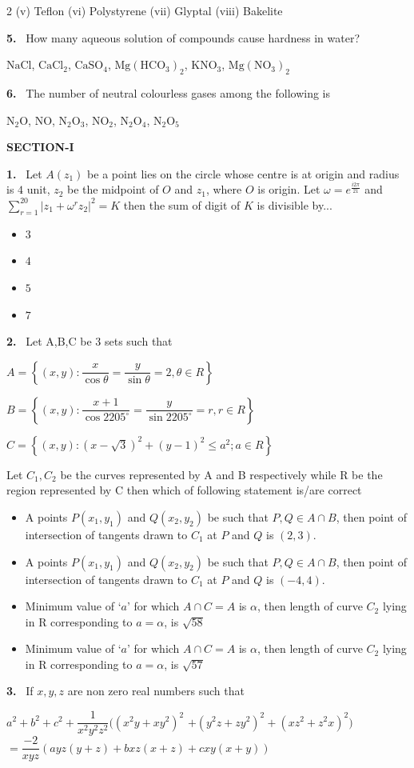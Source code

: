 \documentclass[10pt]{extarticle}
\newcommand{\partsec}[2]{\par\medskip\noindent{\large\bfseries PART-#1: #2}\par\smallskip}
\newcommand{\sect}[1]{\par\smallskip\noindent\textbf{#1}\par}
\newcommand{\qn}[1]{\par\smallskip\noindent\textbf{#1.}~}
\newenvironment{qoptions}{\begin{itemize}[leftmargin=1.8em,itemsep=1pt,topsep=2pt,label={}]}{\end{itemize}}
\newcommand{\opt}[2]{\item[(#1)] #2}
\begin{document}
\begin{multicols}{2}
(v) Teflon \quad (vi) Polystyrene \quad (vii) Glyptal \quad (viii) Bakelite
\qn{5} How many aqueous solution of compounds cause hardness in water?

$\mathrm{NaCl}$, $\mathrm{CaCl_2}$, $\mathrm{CaSO_4}$, $\mathrm{Mg(HCO_3)_2}$, $\mathrm{KNO_3}$, $\mathrm{Mg(NO_3)_2}$
\qn{6} The number of neutral colourless gases among the following is \underline{\hspace{0.8cm}}

$\mathrm{N_2O}$, NO, $\mathrm{N_2O_3}$, $\mathrm{NO_2}$, $\mathrm{N_2O_4}$, $\mathrm{N_2O_5}$
\partsec{3}{MATHEMATICS}
\sect{SECTION-I}
\qn{1} Let $A(z_1)$ be a point lies on the circle whose centre is at origin and radius is $4$ unit, $z_2$ be the midpoint of $O$ and $z_1$, where $O$ is origin. Let $\omega=e^{\frac{i2\pi}{21}}$ and $\displaystyle\sum_{r=1}^{20}|z_1+\omega^rz_2|^2=K$ then the sum of digit of $K$ is divisible by...
\begin{qoptions}
\opt{A}{$3$}
\opt{B}{$4$}
\opt{C}{$5$}
\opt{D}{$7$}
\end{qoptions}
\qn{2} Let A,B,C be $3$ sets such that

$A=\left\{(x,y):\dfrac{x}{\cos\theta}=\dfrac{y}{\sin\theta}=2,\theta\in R\right\}$

$B=\left\{(x,y):\dfrac{x+1}{\cos2205^\circ}=\dfrac{y}{\sin2205^\circ}=r,r\in R\right\}$

$C=\left\{(x,y):(x-\sqrt3)^2+(y-1)^2\leqslant a^2;a\in R\right\}$

Let $C_1,C_2$ be the curves represented by A and B respectively while R be the region represented by C then which of following statement is/are correct
\begin{qoptions}
\opt{A}{A points $P(x_1,y_1)$ and $Q(x_2,y_2)$ be such that $P,Q\in A\cap B$, then point of intersection of tangents drawn to $C_1$ at $P$ and $Q$ is $(2,3)$.}
\opt{B}{A points $P(x_1,y_1)$ and $Q(x_2,y_2)$ be such that $P,Q\in A\cap B$, then point of intersection of tangents drawn to $C_1$ at $P$ and $Q$ is $(-4,4)$.}
\opt{C}{Minimum value of `$a$' for which $A\cap C=A$ is $\alpha$, then length of curve $C_2$ lying in R corresponding to $a=\alpha$, is $\sqrt{58}$}
\opt{D}{Minimum value of `$a$' for which $A\cap C=A$ is $\alpha$, then length of curve $C_2$ lying in R corresponding to $a=\alpha$, is $\sqrt{57}$}
\end{qoptions}
\qn{3} If $x,y,z$ are non zero real numbers such that

$a^2+b^2+c^2+\dfrac{1}{x^2y^2z^2}\Big((x^2y+xy^2)^2$ $+(y^2z+zy^2)^2+(xz^2+z^2x)^2\Big)$
$=\dfrac{-2}{xyz}\left(ayz(y+z)+bxz(x+z)+cxy(x+y)\right)$


\end{multicols}
\end{document}
